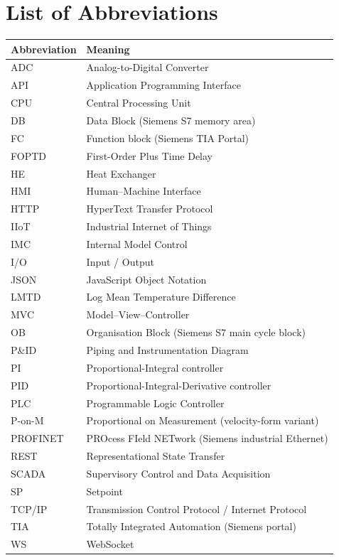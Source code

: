 \clearpage
\chapter*{List of Abbreviations}

\begin{longtable}{@{}L{3cm}L{10cm}@{}}
  \toprule
  \textbf{Abbreviation} & \textbf{Meaning} \\
  \midrule
  \endhead
  \bottomrule
  \endfoot
  ADC       & Analog-to-Digital Converter \\
  API       & Application Programming Interface \\
  CPU       & Central Processing Unit \\
  DB        & Data Block (Siemens S7 memory area) \\
  FC        & Function block (Siemens TIA Portal) \\
  FOPTD     & First-Order Plus Time Delay \\
  HE        & Heat Exchanger \\
  HMI       & Human--Machine Interface \\
  HTTP      & HyperText Transfer Protocol \\
  IIoT      & Industrial Internet of Things \\
  IMC       & Internal Model Control \\
  I/O       & Input / Output \\
  JSON      & JavaScript Object Notation \\
  LMTD      & Log Mean Temperature Difference \\
  MVC       & Model--View--Controller \\
  OB        & Organisation Block (Siemens S7 main cycle block) \\
  P\&ID     & Piping and Instrumentation Diagram \\
  PI        & Proportional-Integral controller \\
  PID       & Proportional-Integral-Derivative controller \\
  PLC       & Programmable Logic Controller \\
  P-on-M    & Proportional on Measurement (velocity-form variant) \\
  PROFINET  & PROcess FIeld NETwork (Siemens industrial Ethernet) \\
  REST      & Representational State Transfer \\
  SCADA     & Supervisory Control and Data Acquisition \\
  SP        & Setpoint \\
  TCP/IP    & Transmission Control Protocol / Internet Protocol \\
  TIA       & Totally Integrated Automation (Siemens portal) \\
  WS        & WebSocket \\
\end{longtable}
